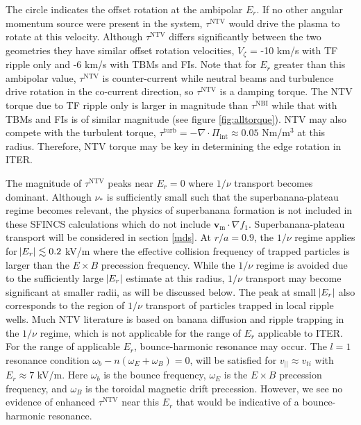 \documentclass[aip, pop, preprint]{revtex4-1}
\numberwithin{figure}{section}
\numberwithin{equation}{section}
\begin{document}
The circle indicates the offset rotation at the ambipolar $E_r$. If no other angular momentum source were present in the system, $\tau^{\text{NTV}}$ would drive the plasma to rotate at this velocity. Although $\tau^{\text{NTV}}$ differs significantly between the two geometries they have similar offset rotation velocities, $V_{\zeta}$ = -10 km/s with TF ripple only and -6 km/s with TBMs and FIs. Note that for $E_r$ greater than this ambipolar value, $\tau^{\text{NTV}}$ is counter-current while neutral beams and turbulence drive rotation in the co-current direction, so $\tau^{\text{NTV}}$ is a damping torque. The NTV torque due to TF ripple only is larger in magnitude than $\tau^{\text{NBI}}$ while that with TBMs and FIs is of similar magnitude (see figure \ref{fig:alltorque}). NTV may also compete with the turbulent torque, $\tau^{\text{turb}} = - \nabla \cdot \Pi_{\text{int}} \approx 0.05$ Nm/m$^3$ at this radius. Therefore, NTV torque may be key in determining the edge rotation in ITER. 

The magnitude of $\tau^{\text{NTV}}$ peaks near $E_r = 0$ where $1/\nu$ transport becomes dominant. Although $\nu_*$ is sufficiently small such that the superbanana-plateau regime becomes relevant, the physics of superbanana formation is not included in these SFINCS calculations which do not include $\bm{v}_{\text{m}} \cdot \nabla f_1$. Superbanana-plateau transport will be considered in section \ref{mds}. At $r/a = 0.9$, the $1/\nu$ regime applies for $\abs{E_r} \lesssim 0.2$ kV/m where the effective collision frequency of trapped particles is larger than the $E \times B$ precession frequency. While the $1/\nu$ regime is avoided due to the sufficiently large $\abs{E_r}$ estimate at this radius, $1/\nu$ transport may become significant at smaller radii, as will be discussed below. The peak at small $\abs{E_r}$ also corresponds to the region of $1/\nu$ transport of particles trapped in local ripple wells. Much NTV literature is based on banana diffusion and ripple trapping in the $1/\nu$ regime,\cite{Stringer1972, Connor1974} which is not applicable for the range of $E_r$ applicable to ITER. For the range of applicable $E_r$, bounce-harmonic resonance may occur. The $l =1$ resonance condition $\omega_b - n(\omega_E + \omega_B) = 0$, will be satisfied for $v_{||} \approx v_{ti}$ with $E_r \approx 7$ kV/m. Here $\omega_b$ is the bounce frequency, $\omega_E$ is the $E \times B$ precession frequency, and $\omega_B$ is the toroidal magnetic drift precession.\cite{Park2009} However, we see no evidence of enhanced $\tau^{\text{NTV}}$ near this $E_r$ that would be indicative of a bounce-harmonic resonance.
\end{document}
